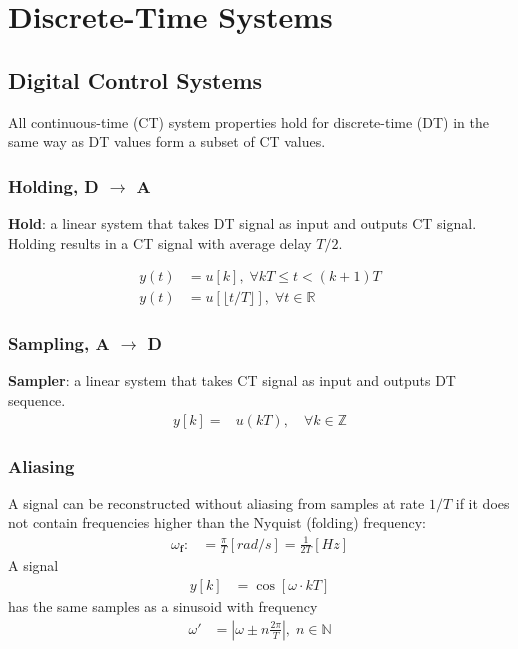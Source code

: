 \section{Discrete-Time Systems}
\subsection{Digital Control Systems}
All continuous-time (CT) system properties hold for discrete-time (DT) in the same way as DT values form a subset of CT values.
\subsubsection{Holding, D $\rightarrow$ A}
\textbf{Hold}: a linear system that takes DT signal as input and outputs CT signal.\\
Holding results in a CT signal with average delay $T/2$.\\


\noindent\begin{align*}
    y(t) & =u[k], \; \forall kT \le t < (k+1)T                 \\
    y(t) & =u[\lfloor t/T\rfloor], \; \forall t \in \mathbb{R}
\end{align*}

\subsubsection{Sampling, A $\rightarrow$ D}
\textbf{Sampler}: a linear system that takes CT signal as input and outputs DT sequence.
\noindent\begin{align*}
    y[k]= & u(kT),\quad\forall k\in\mathbb{Z}
\end{align*}
\subsubsection{Aliasing}

A signal can be reconstructed without aliasing from samples at rate $1/T$ if it does not contain frequencies higher than the Nyquist (folding) frequency:
\noindent\begin{align*}
    \omega_{\mathbf{f}}: & =\frac\pi T[rad/s]=\frac1{2T}[Hz]
\end{align*}
A signal
\noindent\begin{align*}
    y[k] & =\cos[\omega\cdot kT]
\end{align*}
has the same samples as a sinusoid with frequency
\noindent\begin{align*}
    \omega' & =\left|\omega\pm n\frac{2\pi}{T}\right|,\; n\in\mathbb{N}
\end{align*}
%

